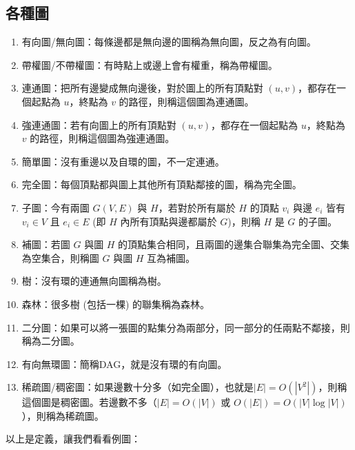 \documentclass[main.tex]{subfiles}
\begin{document}
\subsection{各種圖}
\begin{enumerate}
\item 有向圖/無向圖：每條邊都是無向邊的圖稱為無向圖，反之為有向圖。
\item 帶權圖/不帶權圖：有時點上或邊上會有權重，稱為帶權圖。
\item 連通圖：把所有邊變成無向邊後，對於圖上的所有頂點對 $(u, v)$，都存在一個起點為 $u$，終點為 $v$ 的路徑，則稱這個圖為連通圖。
\item 強連通圖：若有向圖上的所有頂點對 $(u, v)$，都存在一個起點為 $u$，終點為 $v$ 的路徑，則稱這個圖為強連通圖。
\item 簡單圖：沒有重邊以及自環的圖，不一定連通。
\item 完全圖：每個頂點都與圖上其他所有頂點鄰接的圖，稱為完全圖。
\item 子圖：今有兩圖 $G(V, E)$ 與 $H$，若對於所有屬於 $H$ 的頂點 $v_i$ 與邊 $e_i$ 皆有 $v_i \in V$ 且 $e_i \in E$ (即 $H$ 內所有頂點與邊都屬於 $G$)，則稱 $H$ 是 $G$ 的子圖。
\item 補圖：若圖 $G$ 與圖 $H$ 的頂點集合相同，且兩圖的邊集合聯集為完全圖、交集為空集合，則稱圖 $G$ 與圖 $H$ 互為補圖。
\item 樹：沒有環的連通無向圖稱為樹。
\item 森林：很多樹 (包括一棵) 的聯集稱為森林。
\item 二分圖：如果可以將一張圖的點集分為兩部分，同一部分的任兩點不鄰接，則稱為二分圖。
\item 有向無環圖：簡稱DAG，就是沒有環的有向圖。
\item 稀疏圖/稠密圖：如果邊數十分多（如完全圖），也就是$|E| = O(|V^2|)$，則稱這個圖是稠密圖。若邊數不多（$|E| = O(|V|)$ 或 $O(|E|) = O(|V|\log|V|)$），則稱為稀疏圖。
\end{enumerate}

\par 
以上是定義，讓我們看看例圖：

\begin{center}
\end{center}
 
\end{document}
